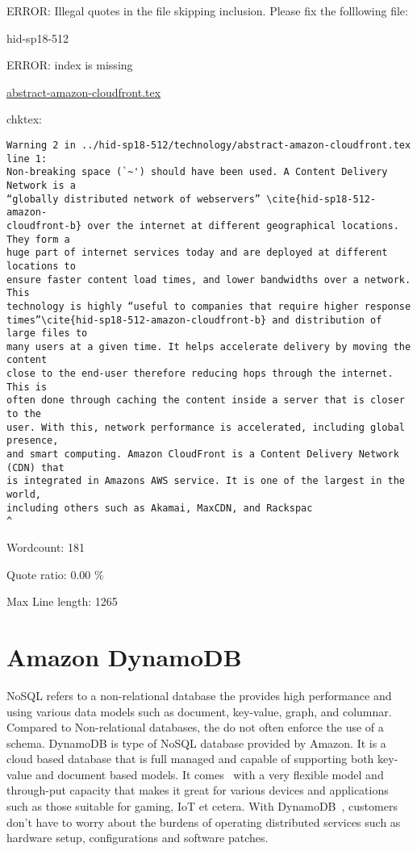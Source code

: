 ERROR: Illegal quotes in the file skipping inclusion. Please fix the folllowing file:

\begin{IU}

hid-sp18-512

ERROR: index is missing

\href{https://github.com/cloudmesh-community/hid-sp18-512/blob/master//technology/abstract-amazon-cloudfront.tex}{abstract-amazon-cloudfront.tex}

 
chktex:
\begin{tiny}
\begin{verbatim}
Warning 2 in ../hid-sp18-512/technology/abstract-amazon-cloudfront.tex line 1:
Non-breaking space (`~') should have been used. A Content Delivery Network is a
“globally distributed network of webservers” \cite{hid-sp18-512-amazon-
cloudfront-b} over the internet at different geographical locations. They form a
huge part of internet services today and are deployed at different locations to
ensure faster content load times, and lower bandwidths over a network. This
technology is highly “useful to companies that require higher response
times”\cite{hid-sp18-512-amazon-cloudfront-b} and distribution of large files to
many users at a given time. It helps accelerate delivery by moving the content
close to the end-user therefore reducing hops through the internet. This is
often done through caching the content inside a server that is closer to the
user. With this, network performance is accelerated, including global presence,
and smart computing. Amazon CloudFront is a Content Delivery Network (CDN) that
is integrated in Amazons AWS service. It is one of the largest in the world,
including others such as Akamai, MaxCDN, and Rackspac
^
\end{verbatim}
\end{tiny}

Wordcount: 181


Quote ratio: 0.00 \%
 
Max Line length: 1265
\end{IU}

\section{Amazon DynamoDB}

NoSQL refers to a non-relational database the provides high performance and using 
various data models such as document, key-value, graph, and columnar.  Compared 
to Non-relational databases, the do not often enforce the use of a schema. 
DynamoDB is type of NoSQL database provided by Amazon. It is a cloud based 
database that is full managed and capable of supporting both key-value and 
document based models. It comes~\cite{hid-sp18-512-amazon-dynamodb} with a 
very flexible model and through-put capacity that makes it great for various 
devices and applications such as those suitable for gaming, IoT et cetera. 
With DynamoDB~\cite{hid-sp18-512-amazon-dynamodb_faq}, customers don’t have 
to worry about the burdens of operating distributed services such as hardware 
setup, configurations and software patches.



